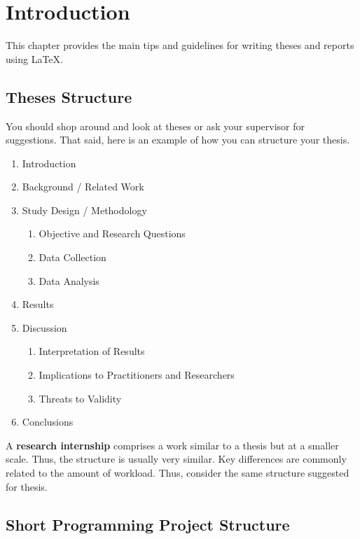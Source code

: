 \chapter{Introduction}
\label{chap:introduction}

This chapter provides the main tips and guidelines for writing theses and reports using \LaTeX.

\section{Theses Structure}
\label{sec:c1:thesesguidelines}

You should shop around and look at theses or ask your supervisor for suggestions.
That said, here is an example of how you can structure your thesis.

\begin{enumerate}
    \item Introduction
    \item Background / Related Work
    \item Study Design / Methodology
    \begin{enumerate}
        \item Objective and Research Questions
        \item Data Collection
        \item Data Analysis
    \end{enumerate}
    \item Results
    \item Discussion
    \begin{enumerate}
        \item Interpretation of Results
        \item Implications to Practitioners and Researchers
        \item Threats to Validity
    \end{enumerate}
    \item Conclusions
\end{enumerate}

A \textbf{research internship} comprises a work similar to a thesis but at a smaller scale. Thus, the structure is usually very similar. Key differences are commonly related to the amount of workload. Thus, consider the same structure suggested for thesis.

\section{Short Programming Project Structure}
\label{sec:c1:sppguidelines}

